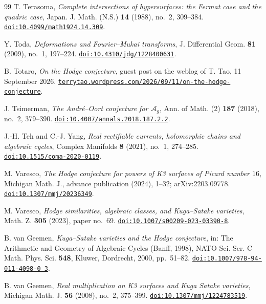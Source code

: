 \begin{thebibliography}{99}
T. Terasoma,
\emph{Complete intersections of hypersurfaces: the Fermat case and the
quadric case},
Japan. J. Math. (N.S.) \textbf{14} (1988), no.~2, 309--384.
\href{https://doi.org/10.4099/math1924.14.309}{\texttt{doi:10.4099/math1924.14.309}}.

Y. Toda,
\emph{Deformations and Fourier--Mukai transforms},
J. Differential Geom. \textbf{81} (2009), no.~1, 197--224.
\href{https://doi.org/10.4310/jdg/1228400631}{\texttt{doi:10.4310/jdg/1228400631}}.

B. Totaro,
\emph{On the Hodge conjecture},
guest post on the weblog of T. Tao, 11 September 2026.
\href{https://terrytao.wordpress.com/2026/09/11/on-the-hodge-conjecture/}%
{\texttt{terrytao.wordpress.com/2026/09/11/on-the-hodge-conjecture}}.

J. Tsimerman,
\emph{The Andr\'e--Oort conjecture for $\mathcal{A}_{g}$},
Ann. of Math. (2) \textbf{187} (2018), no.~2, 379--390.
\href{https://doi.org/10.4007/annals.2018.187.2.2}{\texttt{doi:10.4007/annals.2018.187.2.2}}.

J.-H. Teh and C.-J. Yang,
\emph{Real rectifiable currents, holomorphic chains and algebraic cycles},
Complex Manifolds \textbf{8} (2021), no.~1, 274--285.
\href{https://doi.org/10.1515/coma-2020-0119}{\texttt{doi:10.1515/coma-2020-0119}}.

M. Varesco,
\emph{The Hodge conjecture for powers of K3 surfaces of Picard number $16$},
Michigan Math. J., advance publication (2024), 1--32; arXiv:2203.09778.
\href{https://doi.org/10.1307/mmj/20236349}{\texttt{doi:10.1307/mmj/20236349}}.

M. Varesco,
\emph{Hodge similarities, algebraic classes, and Kuga--Satake varieties},
Math. Z. \textbf{305} (2023), paper no.~69.
\href{https://doi.org/10.1007/s00209-023-03390-8}{\texttt{doi:10.1007/s00209-023-03390-8}}.

B. van Geemen,
\emph{Kuga--Satake varieties and the Hodge conjecture},
in: The Arithmetic and Geometry of Algebraic Cycles (Banff, 1998),
NATO Sci. Ser. C Math. Phys. Sci. \textbf{548},
Kluwer, Dordrecht, 2000, pp.~51--82.
\href{https://doi.org/10.1007/978-94-011-4098-0_3}{\texttt{doi:10.1007/978-94-011-4098-0\_3}}.

B. van Geemen,
\emph{Real multiplication on K3 surfaces and Kuga Satake varieties},
Michigan Math. J. \textbf{56} (2008), no.~2, 375--399.
\href{https://doi.org/10.1307/mmj/1224783519}{\texttt{doi:10.1307/mmj/1224783519}}.


\end{thebibliography}
